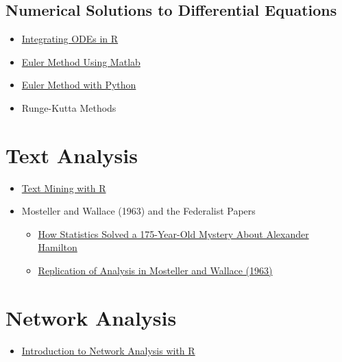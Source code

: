 \documentclass[]{book}
\providecommand{\tightlist}{%
  \setlength{\itemsep}{0pt}\setlength{\parskip}{0pt}}
\begin{document}
\hypertarget{numerical-solutions-to-differential-equations}{%
\subsection{Numerical Solutions to Differential Equations}\label{numerical-solutions-to-differential-equations}}

\begin{itemize}
\tightlist
\item
  \href{https://kingaa.github.io/thid/odes/ODEs_in_R.pdf}{Integrating ODEs in R}
\item
  \href{http://www.ohiouniversityfaculty.com/youngt/IntNumMeth/lecture30.pdf}{Euler Method Using Matlab}
\item
  \href{http://faculty.washington.edu/heathml/2018spring307/euler_method.pdf}{Euler Method with Python}
\item
  Runge-Kutta Methods
\end{itemize}

\hypertarget{text-analysis}{%
\section{Text Analysis}\label{text-analysis}}

\begin{itemize}
\item
  \href{https://www.tidytextmining.com/ngrams.html}{Text Mining with R}
\item
  Mosteller and Wallace (1963) and the Federalist Papers

  \begin{itemize}
  \item
    \href{https://priceonomics.com/how-statistics-solved-a-175-year-old-mystery-about/}{How Statistics Solved a 175-Year-Old Mystery About Alexander Hamilton}
  \item
    \href{http://ptrckprry.com/course/ssd/lecture/federalist.html}{Replication of Analysis in Mosteller and Wallace (1963)}
  \end{itemize}
\end{itemize}

\hypertarget{network-analysis}{%
\section{Network Analysis}\label{network-analysis}}

\begin{itemize}
\tightlist
\item
  \href{https://www.jessesadler.com/post/network-analysis-with-r/}{Introduction to Network Analysis with R}
\end{itemize}
\end{document}
